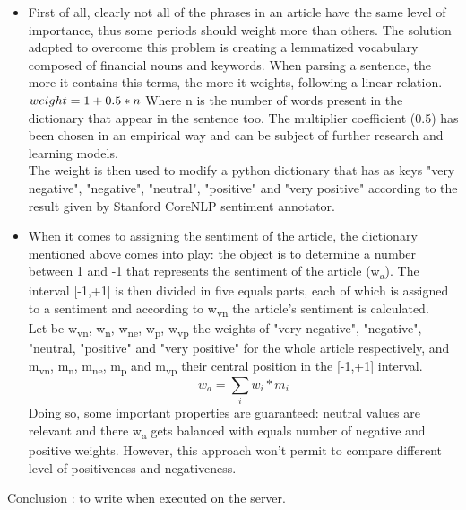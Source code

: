 \begin{itemize}
\item
First of all, clearly not all of the phrases in an article have the same level of importance, thus some periods should weight more than others. The solution adopted to overcome this problem is creating a lemmatized vocabulary composed of financial nouns and keywords. When parsing a sentence, the more it contains this terms, the more it weights, following a linear relation. \\
\begin{math}
weight = 1 + 0.5*n \\
\end{math}
Where n is the number of words present in the dictionary that appear in the sentence too.
The multiplier coefficient (0.5) has been chosen in an empirical way and can be subject of further research and learning models. \\
The weight is then used to modify a python dictionary that has as keys "very negative", "negative", "neutral", "positive" and "very positive" according to the result given by Stanford CoreNLP sentiment annotator.
\item 
When it comes to assigning the sentiment of the article, the dictionary mentioned above comes into play: the object is to determine a number between 1 and -1 that represents the sentiment of the article (w\textsubscript{a}). The interval [-1,+1] is then divided in five equals parts, each of which is assigned to a sentiment and according to w\textsubscript{vn} the article's sentiment is calculated.\\
Let be w\textsubscript{vn}, w\textsubscript{n}, w\textsubscript{ne}, w\textsubscript{p}, w\textsubscript{vp} the weights of "very negative", "negative", "neutral, "positive" and "very positive" for the whole article respectively, and m\textsubscript{vn}, m\textsubscript{n}, m\textsubscript{ne}, m\textsubscript{p} and m\textsubscript{vp} their central position in the [-1,+1] interval. \\
\begin{equation}
w_a = \sum\limits_{i} w_i * m_i
\end{equation}
Doing so, some important properties are guaranteed: neutral values are relevant and there w\textsubscript{a} gets balanced with equals number of negative and positive weights. However, this approach won't permit to compare different level of positiveness and negativeness. 
\end{itemize}

Conclusion : to write when executed on the server.